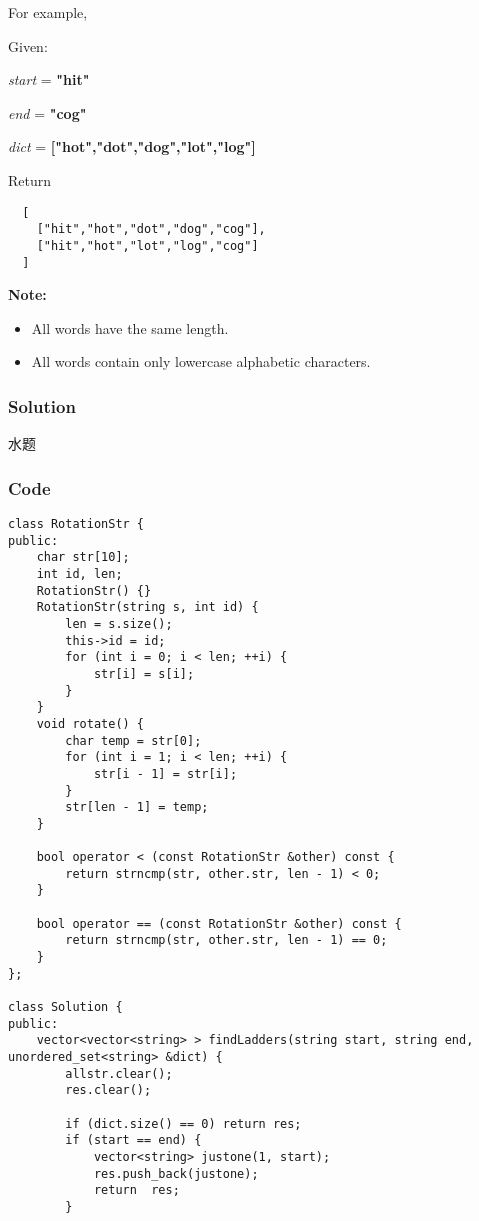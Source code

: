 \documentclass[courier]{article}
\begin{document}
\begin{CJK*}{UTF8}{gkai}
For example,

Given:


\emph{start} = \textbf{"hit"}


\emph{end} = \textbf{"cog"}


\emph{dict} = \textbf{["hot","dot","dog","lot","log"]}

Return


\begin{verbatim}
  [
    ["hit","hot","dot","dog","cog"],
    ["hit","hot","lot","log","cog"]
  ]
\end{verbatim}

\textbf{Note:}



\begin{itemize}
\item All words have the same length.
\item All words contain only lowercase alphabetic characters.
\end{itemize}



\subsubsection*{Solution}
水题

\subsubsection*{Code}
\begin{lstlisting}
class RotationStr {
public:
    char str[10];
    int id, len;
    RotationStr() {}
    RotationStr(string s, int id) {
        len = s.size();
        this->id = id;
        for (int i = 0; i < len; ++i) {
            str[i] = s[i];
        }
    }
    void rotate() {
        char temp = str[0];
        for (int i = 1; i < len; ++i) {
            str[i - 1] = str[i];
        }
        str[len - 1] = temp;
    }
    
    bool operator < (const RotationStr &other) const {
        return strncmp(str, other.str, len - 1) < 0;
    }
    
    bool operator == (const RotationStr &other) const {
        return strncmp(str, other.str, len - 1) == 0;
    }
};

class Solution {
public:
    vector<vector<string> > findLadders(string start, string end, unordered_set<string> &dict) {
        allstr.clear();
        res.clear();
        
        if (dict.size() == 0) return res;
        if (start == end) {
            vector<string> justone(1, start);
            res.push_back(justone);
            return  res;
        }
        

\end{lstlisting}
\end{CJK*}
\end{document}
